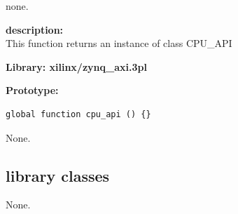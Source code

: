             none.
            
            {\bf description:} \\
            This function returns an instance of class CPU\_API

            {\bf Library: xilinx/zynq\_axi.3pl}

            {\bf Prototype:} \\
            \vsp
            \begin{lstlisting}[gobble=12, language=threepl]
                global function cpu_api () {}
            \end{lstlisting}
    
        None.




    \subsection{library classes}
    
        None.


